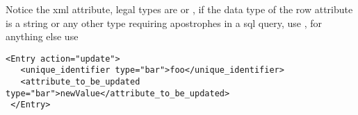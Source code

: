 Notice the  xml attribute, legal types are  or , if the data type of the row attribute is a string or any other type requiring apostrophes
in a sql query, use , for anything else use 

\begin{lstlisting}[label=code:sw6mlExample02,caption="sw6ml Update syntax example]
 <Entry action="update">
   <unique_identifier type="bar">foo</unique_identifier>
   <attribute_to_be_updated type="bar">newValue</attribute_to_be_updated>
 </Entry>
\end{lstlisting}





